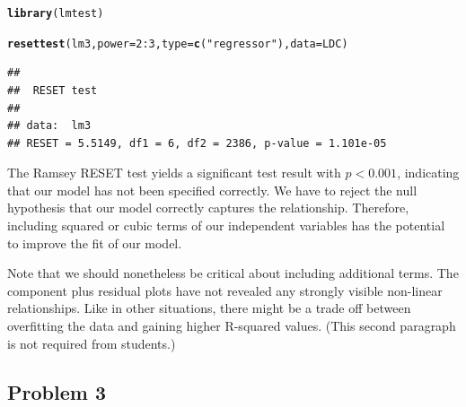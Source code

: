 \documentclass[12pt]{article}\usepackage[]{graphicx}\usepackage[]{color}
\makeatletter
\newcommand{\hlnum}[1]{\textcolor[rgb]{0.686,0.059,0.569}{#1}}%
\newcommand{\hlstr}[1]{\textcolor[rgb]{0.192,0.494,0.8}{#1}}%
\newcommand{\hlopt}[1]{\textcolor[rgb]{0,0,0}{#1}}%
\newcommand{\hlstd}[1]{\textcolor[rgb]{0.345,0.345,0.345}{#1}}%
\newcommand{\hlkwc}[1]{\textcolor[rgb]{0.333,0.667,0.333}{#1}}%
\newcommand{\hlkwd}[1]{\textcolor[rgb]{0.737,0.353,0.396}{\textbf{#1}}}%
\newenvironment{kframe}{%
 \def\at@end@of@kframe{}%
 \ifinner\ifhmode%
  \def\at@end@of@kframe{\end{minipage}}%
  \begin{minipage}{\columnwidth}%
 \fi\fi%
 \def\FrameCommand##1{\hskip\@totalleftmargin \hskip-\fboxsep
 \colorbox{shadecolor}{##1}\hskip-\fboxsep
     \hskip-\linewidth \hskip-\@totalleftmargin \hskip\columnwidth}%
 \MakeFramed {\advance\hsize-\width
   \@totalleftmargin\z@ \linewidth\hsize
   \@setminipage}}%
 {\par\unskip\endMakeFramed%
 \at@end@of@kframe}
\newenvironment{knitrout}{}{} %
\makeatother
\begin{document}
\begin{knitrout}
\color{fgcolor}\begin{kframe}
\begin{alltt}
\hlkwd{library}\hlstd{(lmtest)}
\end{alltt}


{\ttfamily\noindent\itshape\color{messagecolor}{\#\# Loading required package: zoo\\\#\# \\\#\# Attaching package: 'zoo'\\\#\# \\\#\# The following objects are masked from 'package:base':\\\#\# \\\#\#\ \ \ \  as.Date, as.Date.numeric}}\begin{alltt}
\hlkwd{resettest}\hlstd{(lm3,} \hlkwc{power} \hlstd{=} \hlnum{2}\hlopt{:}\hlnum{3}\hlstd{,} \hlkwc{type} \hlstd{=} \hlkwd{c}\hlstd{(}\hlstr{"regressor"}\hlstd{),} \hlkwc{data} \hlstd{= LDC)}
\end{alltt}
\begin{verbatim}
## 
## 	RESET test
## 
## data:  lm3
## RESET = 5.5149, df1 = 6, df2 = 2386, p-value = 1.101e-05
\end{verbatim}
\end{kframe}
\end{knitrout}

The Ramsey RESET test yields a significant test result with $p < 0.001$, indicating that our model has not been specified correctly. We have to reject the null hypothesis that our model correctly captures the relationship. Therefore, including squared or cubic terms of our independent variables has the potential to improve the fit of our model.

Note that we should nonetheless be critical about including additional terms. The component plus residual plots have not revealed any strongly visible non-linear relationships. Like in other situations, there might be a trade off between overfitting the data and gaining higher R-squared values. (This second paragraph is not required from students.)



\subsection*{Problem 3}
\end{document}

